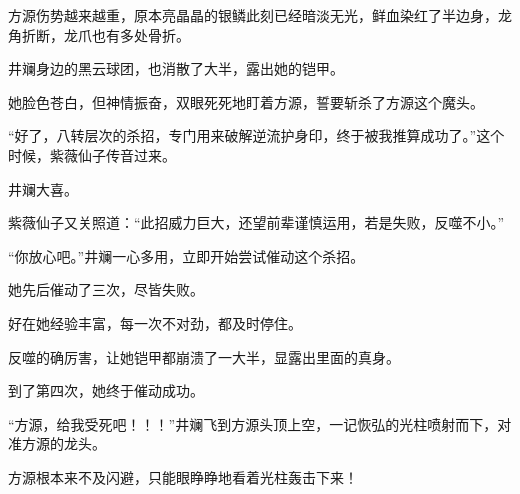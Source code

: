 \begin{this_body}
方源伤势越来越重，原本亮晶晶的银鳞此刻已经暗淡无光，鲜血染红了半边身，龙角折断，龙爪也有多处骨折。

井斓身边的黑云球团，也消散了大半，露出她的铠甲。

她脸色苍白，但神情振奋，双眼死死地盯着方源，誓要斩杀了方源这个魔头。

“好了，八转层次的杀招，专门用来破解逆流护身印，终于被我推算成功了。”这个时候，紫薇仙子传音过来。

井斓大喜。

紫薇仙子又关照道：“此招威力巨大，还望前辈谨慎运用，若是失败，反噬不小。”

“你放心吧。”井斓一心多用，立即开始尝试催动这个杀招。

她先后催动了三次，尽皆失败。

好在她经验丰富，每一次不对劲，都及时停住。

反噬的确厉害，让她铠甲都崩溃了一大半，显露出里面的真身。

到了第四次，她终于催动成功。

“方源，给我受死吧！！！”井斓飞到方源头顶上空，一记恢弘的光柱喷射而下，对准方源的龙头。

方源根本来不及闪避，只能眼睁睁地看着光柱轰击下来！

\end{this_body}


